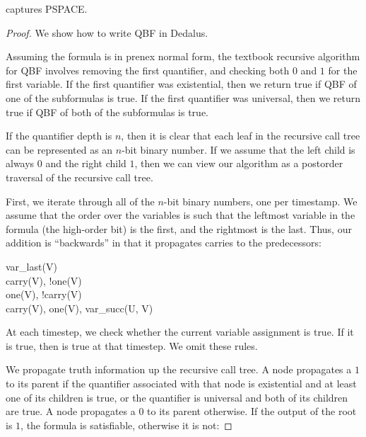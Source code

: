 \begin{lemma}
\label{lem:lang-pspace}
\lang captures PSPACE.
\end{lemma}
\begin{proof}
We show how to write QBF in Dedalus.

Assuming the formula is in prenex normal form, the textbook recursive algorithm for QBF  involves removing the first quantifier, and checking both $0$ and $1$ for the first variable.  If the first quantifier was existential, then we return true if QBF of one of the subformulas is true.  If the first quantifier was universal, then we return true if QBF of both of the subformulas is true.

If the quantifier depth is $n$, then it is clear that each leaf in the recursive call tree can be represented as an $n$-bit binary number.  If we assume that the left child is always $0$ and the right child $1$, then we can view our algorithm as a postorder traversal of the recursive call tree.

First, we iterate through all of the $n$-bit binary numbers, one per timestamp.  We assume that the order over the variables is such that the leftmost variable in the formula (the high-order bit) is the first, and the rightmost is the last.  Thus, our addition is ``backwards'' in that it propagates carries to the predecessors:

\begin{Drules}
        {var\_last(V)} \\
        {carry(V), !one(V)} \\
        {one(V), !carry(V)} \\
        {carry(V), one(V), var\_succ(U, V)}
\end{Drules}

At each timestep, we check whether the current variable assignment is true.  If it is true, then  is true at that timestep.  We omit these rules.

We propagate truth information up the recursive call tree.  A node propagates a $1$ to its parent if the quantifier associated with that node is existential and at least one of its children is true, or the quantifier is universal and both of its children are true.  A node propagates a $0$ to its parent otherwise.  If the output of the root is $1$, the formula is satisfiable, otherwise it is not: 


\end{proof}

